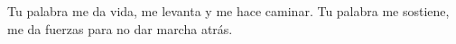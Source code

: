 \beginverse*
Tu palabra me da vida,
me levanta y me hace caminar.
Tu palabra me sostiene,
me da fuerzas para no dar 
marcha atrás.
\endverse
\endsong
